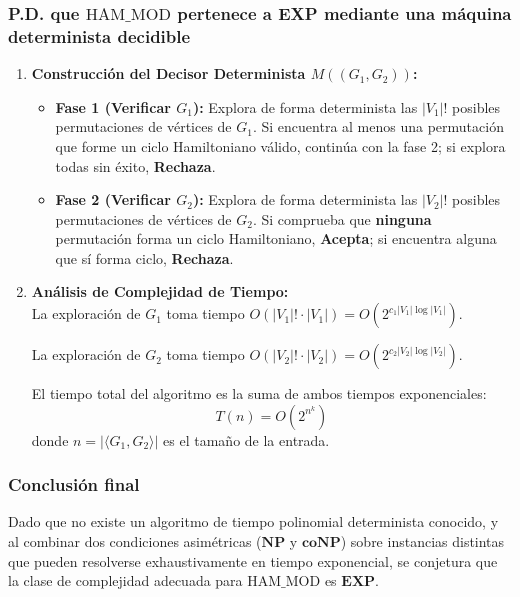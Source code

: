 \begin{itemize}[leftmargin=*]
    \subsubsection*{P.D. que $\text{HAM\_MOD}$ pertenece a EXP mediante una máquina determinista decidible}

    \begin{enumerate}[label=\arabic*., leftmargin=*]
        \item \textbf{Construcción del Decisor Determinista $M((G_1, G_2))$:}
        \begin{itemize}[leftmargin=*]
            \item \textbf{Fase 1 (Verificar $G_1$):} Explora de forma determinista las $|V_1|!$ posibles permutaciones de vértices de $G_1$. Si encuentra al menos una permutación que forme un ciclo Hamiltoniano válido, continúa con la fase 2; si explora todas sin éxito, \textbf{Rechaza}.
            \item \textbf{Fase 2 (Verificar $G_2$):} Explora de forma determinista las $|V_2|!$ posibles permutaciones de vértices de $G_2$. Si comprueba que \textbf{ninguna} permutación forma un ciclo Hamiltoniano, \textbf{Acepta}; si encuentra alguna que sí forma ciclo, \textbf{Rechaza}.
        \end{itemize}

        \item \textbf{Análisis de Complejidad de Tiempo:}\\
        La exploración de $G_1$ toma tiempo $O(|V_1|! \cdot |V_1|) = O(2^{c_1 |V_1| \log |V_1|})$.

        La exploración de $G_2$ toma tiempo $O(|V_2|! \cdot |V_2|) = O(2^{c_2 |V_2| \log |V_2|})$.

        El tiempo total del algoritmo es la suma de ambos tiempos exponenciales:
        \[ T(n) = O(2^{n^k}) \]
        donde $n = |\langle G_1, G_2 \rangle|$ es el tamaño de la entrada.
    \end{enumerate}

    \subsubsection*{Conclusión final}
    Dado que no existe un algoritmo de tiempo polinomial determinista conocido, y al combinar dos condiciones asimétricas ($\mathbf{NP}$ y $\mathbf{coNP}$) sobre instancias distintas que pueden resolverse exhaustivamente en tiempo exponencial, se conjetura que la clase de complejidad adecuada para $\text{HAM\_MOD}$ es \textbf{$\mathbf{EXP}$}.


\end{itemize}
